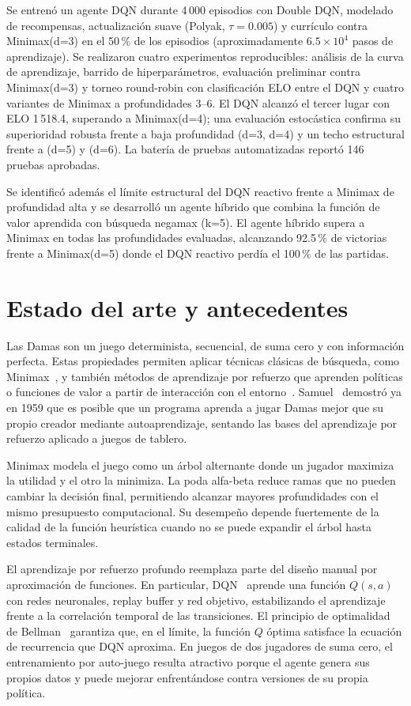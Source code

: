 \documentclass[11pt,a4paper]{article}
\begin{document}
Se entrenó un agente DQN durante 4\,000 episodios con Double DQN, modelado de recompensas, actualización suave (Polyak, $\tau=0.005$) y currículo contra Minimax(d=3) en el 50\,\% de los episodios (aproximadamente $6.5\times10^{4}$ pasos de aprendizaje). Se realizaron cuatro experimentos reproducibles: análisis de la curva de aprendizaje, barrido de hiperparámetros, evaluación preliminar contra Minimax(d=3) y torneo round-robin con clasificación ELO entre el DQN y cuatro variantes de Minimax a profundidades 3--6. El DQN alcanzó el tercer lugar con ELO 1\,518.4, superando a Minimax(d=4); una evaluación estocástica confirma su superioridad robusta frente a baja profundidad (d=3, d=4) y un techo estructural frente a (d=5) y (d=6). La batería de pruebas automatizadas reportó 146 pruebas aprobadas.

Se identificó además el límite estructural del DQN reactivo frente a Minimax de profundidad alta y se desarrolló un agente híbrido que combina la función de valor aprendida con búsqueda negamax (k=5). El agente híbrido supera a Minimax en todas las profundidades evaluadas, alcanzando 92.5\,\% de victorias frente a Minimax(d=5) donde el DQN reactivo perdía el 100\,\% de las partidas.

\section{Estado del arte y antecedentes}

Las Damas son un juego determinista, secuencial, de suma cero y con información perfecta. Estas propiedades permiten aplicar técnicas clásicas de búsqueda, como Minimax~\cite{shannon1950}, y también métodos de aprendizaje por refuerzo que aprenden políticas o funciones de valor a partir de interacción con el entorno~\cite{sutton2018}. Samuel~\cite{samuel1959} demostró ya en 1959 que es posible que un programa aprenda a jugar Damas mejor que su propio creador mediante autoaprendizaje, sentando las bases del aprendizaje por refuerzo aplicado a juegos de tablero.

Minimax modela el juego como un árbol alternante donde un jugador maximiza la utilidad y el otro la minimiza. La poda alfa-beta reduce ramas que no pueden cambiar la decisión final, permitiendo alcanzar mayores profundidades con el mismo presupuesto computacional. Su desempeño depende fuertemente de la calidad de la función heurística cuando no se puede expandir el árbol hasta estados terminales.

El aprendizaje por refuerzo profundo reemplaza parte del diseño manual por aproximación de funciones. En particular, DQN~\cite{mnih2015} aprende una función $Q(s,a)$ con redes neuronales, replay buffer y red objetivo, estabilizando el aprendizaje frente a la correlación temporal de las transiciones. El principio de optimalidad de Bellman~\cite{bellman1957} garantiza que, en el límite, la función $Q$ óptima satisface la ecuación de recurrencia que DQN aproxima. En juegos de dos jugadores de suma cero, el entrenamiento por auto-juego resulta atractivo porque el agente genera sus propios datos y puede mejorar enfrentándose contra versiones de su propia política.
\end{document}

